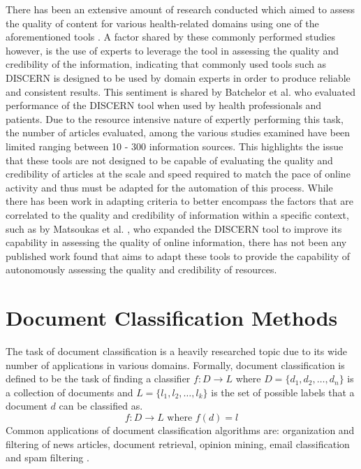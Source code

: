 \documentclass[a4paper,twoside,phd]{BYUPhys}
\begin{document}
There has been an extensive amount of research conducted which aimed to assess the quality of content for various health-related domains using one of the aforementioned tools \cite{CanteyBanasiak2017} \cite{Cipriani} \cite{Kaicker2010} \cite{Som2012}. A factor shared by these commonly performed studies however, is the use of experts to leverage the tool in assessing the quality and credibility of the information, indicating that commonly used tools such as DISCERN is designed to be used by domain experts in order to produce reliable and consistent results. This sentiment is shared by Batchelor et al. \cite{Batchelor2009} who evaluated performance of the DISCERN tool when used by health professionals and patients. Due to the resource intensive nature of expertly performing this task, the number of articles evaluated, among the various studies examined have been limited ranging between 10 - 300 information sources. This highlights the issue that these tools are not designed to be capable of evaluating the quality and credibility of articles at the scale and speed required to match the pace of online activity and thus must be adapted for the automation of this process. While there has been work in adapting criteria to better encompass the factors that are correlated to the quality and credibility of information within a specific context, such as by Matsoukas et al. \cite{Matsoukas2008}, who expanded the DISCERN tool to improve its capability in assessing the quality of online information, there has not been any published work found that aims to adapt these tools to provide the capability of autonomously assessing the quality and credibility of resources.

\section{Document Classification Methods}
\label{sec:DocumentClassification}

The task of document classification is a heavily researched topic due to its wide number of applications in various domains. Formally, document classification is defined to be the task of finding a classifier $f: D \rightarrow L$ where $D = \{d_1, d_2, \dots, d_n\} $ is a collection of documents and $L = \{l_1, l_2,\dots, l_k\}$ is the set of possible labels that a document $d$ can be classified as. 
\begin{equation}
\label{eq:TextClassification}
f: D \rightarrow L \text{ where } f(d) = l
\end{equation}
Common applications of document classification algorithms are: organization and filtering of news articles, document retrieval, opinion mining, email classification and spam filtering \cite{Aggarwal2012}.
\end{document}
